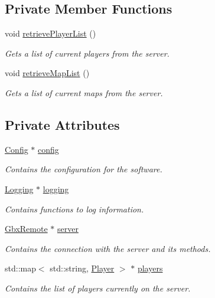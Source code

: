 \subsection*{Private Member Functions}
\begin{DoxyCompactItemize}
\item 
void \hyperlink{classManiaPP_aede94c0b982250de19186d447542e479}{retrieve\-Player\-List} ()
\begin{DoxyCompactList}\small\item\em Gets a list of current players from the server. \end{DoxyCompactList}\item 
void \hyperlink{classManiaPP_a18582fa28b259c22a8a8d526af62123a}{retrieve\-Map\-List} ()
\begin{DoxyCompactList}\small\item\em Gets a list of current maps from the server. \end{DoxyCompactList}\end{DoxyCompactItemize}
\subsection*{Private Attributes}
\begin{DoxyCompactItemize}
\item 
\hyperlink{classConfig}{Config} $\ast$ \hyperlink{classManiaPP_a9a91437fa70afd52c2dce19298888e36}{config}
\begin{DoxyCompactList}\small\item\em Contains the configuration for the software. \end{DoxyCompactList}\item 
\hyperlink{classLogging}{Logging} $\ast$ \hyperlink{classManiaPP_aa4cea090301bdf0bf652ad377e7b01c0}{logging}
\begin{DoxyCompactList}\small\item\em Contains functions to log information. \end{DoxyCompactList}\item 
\hyperlink{classGbxRemote}{Gbx\-Remote} $\ast$ \hyperlink{classManiaPP_ab81311d6901990cb99a7a30e0cbaab11}{server}
\begin{DoxyCompactList}\small\item\em Contains the connection with the server and its methods. \end{DoxyCompactList}\item 
std\-::map$<$ std\-::string, \hyperlink{structPlayer}{Player} $>$ $\ast$ \hyperlink{classManiaPP_a45712ccfa91b20242b39cb1164d305d8}{players}
\begin{DoxyCompactList}\small\item\em Contains the list of players currently on the server. \end{DoxyCompactList}\end{DoxyCompactItemize}


